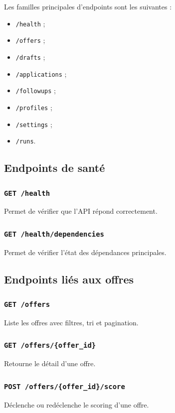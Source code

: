 \documentclass[11pt,a4paper]{article}
\begin{document}
Les familles principales d’endpoints sont les suivantes :

\begin{itemize}
    \item \texttt{/health} ;
    \item \texttt{/offers} ;
    \item \texttt{/drafts} ;
    \item \texttt{/applications} ;
    \item \texttt{/followups} ;
    \item \texttt{/profiles} ;
    \item \texttt{/settings} ;
    \item \texttt{/runs}.
\end{itemize}

\subsection{Endpoints de santé}

\subsubsection{\texttt{GET /health}}
Permet de vérifier que l’API répond correctement.

\subsubsection{\texttt{GET /health/dependencies}}
Permet de vérifier l’état des dépendances principales.

\subsection{Endpoints liés aux offres}

\subsubsection{\texttt{GET /offers}}
Liste les offres avec filtres, tri et pagination.

\subsubsection{\texttt{GET /offers/\{offer\_id\}}}
Retourne le détail d’une offre.

\subsubsection{\texttt{POST /offers/\{offer\_id\}/score}}
Déclenche ou redéclenche le scoring d’une offre.
\end{document}
